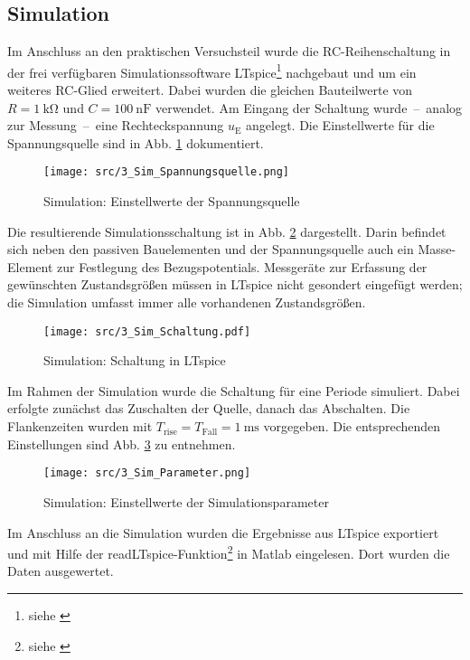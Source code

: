 \subsection{Simulation}
\label{subsec:3_Simulation}
%
Im Anschluss an den praktischen Versuchsteil wurde die RC-Reihenschaltung in der frei verfügbaren Simulationssoftware LTspice\footnote{siehe \cite{src:LTspice}} nachgebaut und um ein weiteres RC-Glied erweitert. Dabei wurden die gleichen Bauteilwerte von $R = \SI{1}{\kilo\ohm}$ und $C = \SI{100}{\nano\farad}$ verwendet. Am Eingang der Schaltung wurde~--~analog zur Messung~--~eine Rechteckspannung $u_\mathrm{E}$ angelegt. Die Einstellwerte für die Spannungsquelle sind in Abb. \ref{fig:3_Sim_Spannungsquelle} dokumentiert.
%
\begin{figure}[H]
  \centering
  \texttt{[image: src/3\_Sim\_Spannungsquelle.png]}
  \caption{Simulation: Einstellwerte der Spannungsquelle}
  \label{fig:3_Sim_Spannungsquelle}
\end{figure}
%
Die resultierende Simulationsschaltung ist in Abb. \ref{fig:3_Sim_Schaltung} dargestellt. Darin befindet sich neben den passiven Bauelementen und der Spannungsquelle auch ein Masse-Element zur Festlegung des Bezugspotentials. Messgeräte zur Erfassung der gewünschten Zustandsgrößen müssen in LTspice nicht gesondert eingefügt werden; die Simulation umfasst immer alle vorhandenen Zustandsgrößen.
%
\begin{figure}[H]
  \centering
  \texttt{[image: src/3\_Sim\_Schaltung.pdf]}
  \caption{Simulation: Schaltung in LTspice}
  \label{fig:3_Sim_Schaltung}
\end{figure}
%
Im Rahmen der Simulation wurde die Schaltung für eine Periode simuliert. Dabei erfolgte zunächst das Zuschalten der Quelle, danach das Abschalten. Die Flankenzeiten wurden mit $T_\mathrm{rise} = T_\mathrm{Fall} = \SI{1}{\milli\second}$ vorgegeben. Die entsprechenden Einstellungen sind Abb. \ref{fig:3_Sim_Parameter} zu entnehmen.
%
\begin{figure}[H]
  \centering
  \texttt{[image: src/3\_Sim\_Parameter.png]}
  \caption{Simulation: Einstellwerte der Simulationsparameter}
  \label{fig:3_Sim_Parameter}
\end{figure}
%
Im Anschluss an die Simulation wurden die Ergebnisse aus LTspice exportiert und mit Hilfe der readLTspice-Funktion\footnote{siehe \cite{src:readLTspice}} in Matlab eingelesen. Dort wurden die Daten ausgewertet.
%
%
%